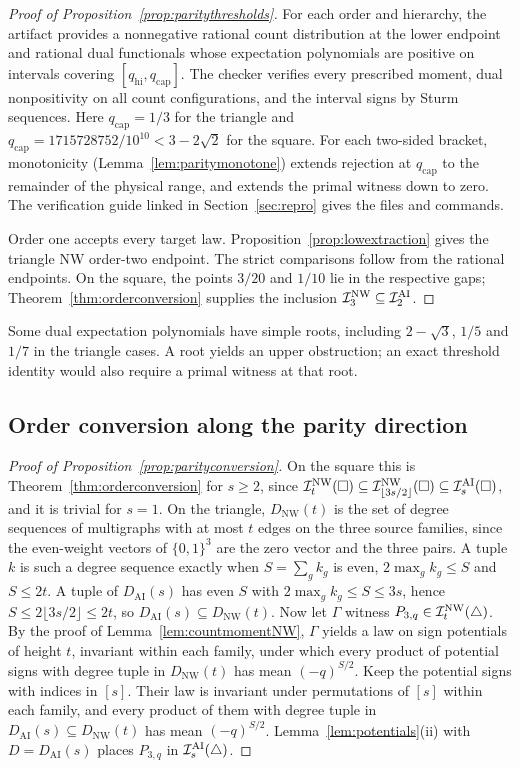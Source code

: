\begin{proof}[Proof of Proposition~\ref{prop:paritythresholds}]
For each order and hierarchy, the artifact provides a nonnegative rational count distribution at the lower endpoint and rational dual functionals whose expectation polynomials are positive on intervals covering $[q_{\mathrm{hi}},q_{\mathrm{cap}}]$. The checker verifies every prescribed moment, dual nonpositivity on all count configurations, and the interval signs by Sturm sequences. Here $q_{\mathrm{cap}}=1/3$ for the triangle and $q_{\mathrm{cap}}=1715728752/10^{10}<3-2\sqrt2$ for the square. For each two-sided bracket, monotonicity (Lemma~\ref{lem:paritymonotone}) extends rejection at $q_{\mathrm{cap}}$ to the remainder of the physical range, and extends the primal witness down to zero. The verification guide linked in Section~\ref{sec:repro} gives the files and commands.

Order one accepts every target law. Proposition~\ref{prop:lowextraction} gives the triangle NW order-two endpoint. The strict comparisons follow from the rational endpoints. On the square, the points $3/20$ and $1/10$ lie in the respective gaps; Theorem~\ref{thm:orderconversion} supplies the inclusion $\mathcal I^{\mathrm{NW}}_3\subseteq\mathcal I^{\mathrm{AI}}_2$.
\end{proof}

Some dual expectation polynomials have simple roots, including $2-\sqrt3$, $1/5$ and $1/7$ in the triangle cases. A root yields an upper obstruction; an exact threshold identity would also require a primal witness at that root.

\subsection{Order conversion along the parity direction}\label{app:parityconversion}

\begin{proof}[Proof of Proposition~\ref{prop:parityconversion}]
On the square this is Theorem~\ref{thm:orderconversion} for $s\ge2$, since $\mathcal I^{\mathrm{NW}}_t(\square)\subseteq\mathcal I^{\mathrm{NW}}_{\lfloor3s/2\rfloor}(\square)\subseteq\mathcal I^{\mathrm{AI}}_s(\square)$, and it is trivial for $s=1$. On the triangle, $D_{\mathrm{NW}}(t)$ is the set of degree sequences of multigraphs with at most $t$ edges on the three source families, since the even-weight vectors of $\{0,1\}^3$ are the zero vector and the three pairs. A tuple $k$ is such a degree sequence exactly when $S=\sum_gk_g$ is even, $2\max_gk_g\le S$ and $S\le2t$. A tuple of $D_{\mathrm{AI}}(s)$ has even $S$ with $2\max_gk_g\le S\le3s$, hence $S\le2\lfloor3s/2\rfloor\le2t$, so $D_{\mathrm{AI}}(s)\subseteq D_{\mathrm{NW}}(t)$. Now let $\Gamma$ witness $P_{3,q}\in\mathcal I^{\mathrm{NW}}_t(\triangle)$. By the proof of Lemma~\ref{lem:countmomentNW}, $\Gamma$ yields a law on sign potentials of height $t$, invariant within each family, under which every product of potential signs with degree tuple in $D_{\mathrm{NW}}(t)$ has mean $(-q)^{S/2}$. Keep the potential signs with indices in $[s]$. Their law is invariant under permutations of $[s]$ within each family, and every product of them with degree tuple in $D_{\mathrm{AI}}(s)\subseteq D_{\mathrm{NW}}(t)$ has mean $(-q)^{S/2}$. Lemma~\ref{lem:potentials}(ii) with $D=D_{\mathrm{AI}}(s)$ places $P_{3,q}$ in $\mathcal I^{\mathrm{AI}}_s(\triangle)$.
\end{proof}
